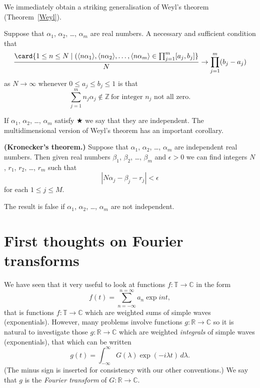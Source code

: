 We immediately obtain a striking generalisation of
Weyl's theorem (Theorem~\ref{Weyl}).
\begin{lemma}\label{T, Weyl many} Suppose
that $\alpha_{1}$, $\alpha_{2}$, \dots, $\alpha_{m}$
are real numbers. A necessary and sufficient condition
that
\[\frac{\card\{1\leq n\leq N \mid
(\langle n\alpha_{1}\rangle,\langle n\alpha_{2}\rangle,
\dots,\langle n\alpha_{m}\rangle
\in \prod_{j=1}^{m}[a_{j},b_{j}]\}}{N}
\rightarrow \prod_{j=1}^{m}(b_{j}-a_{j})\]
as $N\rightarrow\infty$ whenever $0\leq a_{j}\leq b_{j}\leq 1$
is that
\begin{equation*}
\sum_{j=1}^{m} n_{j}\alpha_{j}\notin{\mathbb Z}
\ \text{for integer $n_{j}$ not all zero}. \tag*{$\bigstar$}
\end{equation*}
\end{lemma}
If $\alpha_{1}$, $\alpha_{2}$, \dots, $\alpha_{m}$
satisfy $\bigstar$ we say that they are independent.
The multidimensional version of Weyl's theorem has
an important corollary.
\begin{theorem}{\bf (Kronecker's theorem.)}\label{Kronecker's theorem}
Suppose
that $\alpha_{1}$, $\alpha_{2}$, \dots, $\alpha_{m}$
are independent real numbers. Then given real
numbers $\beta_{1}$, $\beta_{2}$, \dots, $\beta_{m}$
and $\epsilon>0$ we can find integers
$N$, $r_{1}$, $r_{2}$, \dots, $r_{m}$ such that
\[|N\alpha_{j}-\beta_{j}-r_{j}|<\epsilon\]
for each $1\leq j\leq M$.

The result is false if
$\alpha_{1}$, $\alpha_{2}$, \dots, $\alpha_{m}$
are not independent.
\end{theorem}
\section{First thoughts on Fourier transforms} We have
seen that it very useful to look at functions
$f:{\mathbb T}\rightarrow{\mathbb C}$ in the form
\[f(t)=\sum_{n=-\infty}^{n=\infty}a_{n}\exp int,\]
that is functions $f:{\mathbb T}\rightarrow{\mathbb C}$ which
are weighted sums of simple waves (exponentials).
However, many problems involve functions
$g:{\mathbb R}\rightarrow{\mathbb C}$ so it is natural to
investigate those $g:{\mathbb R}\rightarrow{\mathbb C}$
which are weighted \emph{integrals} of simple waves (exponentials),
that which can be written
\[g(t)=\int_{-\infty}^{\infty}G(\lambda)\exp(-i\lambda t)\,d\lambda.\]
(The minus sign is inserted for consistency with our other
conventions.)
We say that $g$ is the \emph{Fourier transform}
of $G:{\mathbb R}\rightarrow{\mathbb C}$.

